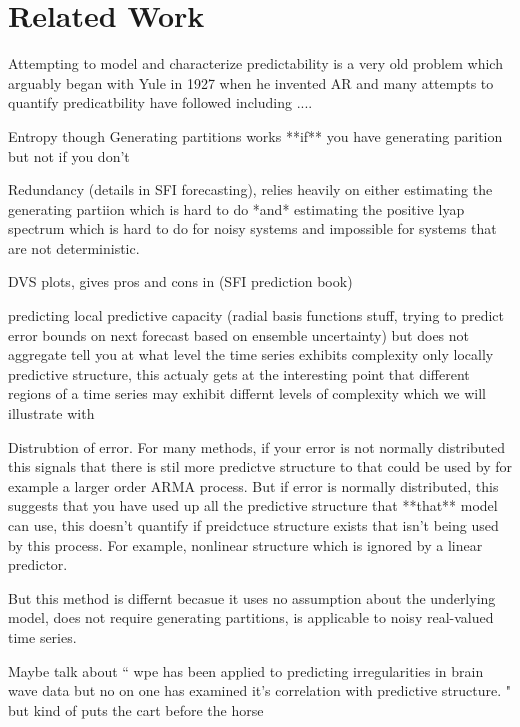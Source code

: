 \section{Related Work}

Attempting to model and characterize predictability is a very old problem which arguably began with Yule in 1927 when he invented AR and many attempts to quantify predicatbility have followed including ....

Entropy though Generating partitions 
works **if** you have generating parition but not if you don't

Redundancy (details in SFI forecasting), relies heavily on either estimating the generating partiion which is hard to do *and* estimating the positive lyap spectrum which is hard to do for noisy systems and impossible for systems that are not deterministic. 

DVS plots, gives pros and cons in (SFI prediction book)

predicting local predictive capacity (radial basis functions stuff, trying to predict error bounds on next forecast based on ensemble uncertainty) but does not aggregate tell you at what level the time series exhibits complexity only locally predictive structure, this actualy gets at the interesting point that different regions of a time series may exhibit differnt levels of complexity which we will illustrate with \svd

Distrubtion of error. For many methods, if your error is not normally distributed this signals that there is stil more predictve structure to that could be used by for example a larger order ARMA process. But if error is normally distributed, this suggests that you have used up all the predictive structure that **that** model can use, this doesn't quantify if preidctuce structure exists that isn't being used by this process. For example, nonlinear structure which is ignored by a linear predictor. 


But this method is differnt becasue it uses no assumption about the underlying model, does not require generating partitions, is applicable to noisy real-valued time series. 


Maybe talk about ``
wpe has been applied to predicting irregularities in brain wave data but no on one has examined it's correlation with predictive structure. "
but kind of puts the cart before the horse


